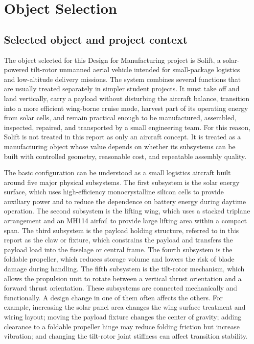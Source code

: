 \chapter{Object Selection}
\label{sec:object-selection}

\section{Selected object and project context}
\label{subsec:selected-object}

The object selected for this Design for Manufacturing project is Solift, a solar-powered tilt-rotor unmanned aerial vehicle intended for small-package logistics and low-altitude delivery missions. The system combines several functions that are usually treated separately in simpler student projects. It must take off and land vertically, carry a payload without disturbing the aircraft balance, transition into a more efficient wing-borne cruise mode, harvest part of its operating energy from solar cells, and remain practical enough to be manufactured, assembled, inspected, repaired, and transported by a small engineering team. For this reason, Solift is not treated in this report as only an aircraft concept. It is treated as a manufacturing object whose value depends on whether its subsystems can be built with controlled geometry, reasonable cost, and repeatable assembly quality.

The basic configuration can be understood as a small logistics aircraft built around five major physical subsystems. The first subsystem is the solar energy surface, which uses high-efficiency monocrystalline silicon cells to provide auxiliary power and to reduce the dependence on battery energy during daytime operation. The second subsystem is the lifting wing, which uses a stacked triplane arrangement and an MH114 airfoil to provide large lifting area within a compact span. The third subsystem is the payload holding structure, referred to in this report as the claw or fixture, which constrains the payload and transfers the payload load into the fuselage or central frame. The fourth subsystem is the foldable propeller, which reduces storage volume and lowers the risk of blade damage during handling. The fifth subsystem is the tilt-rotor mechanism, which allows the propulsion unit to rotate between a vertical thrust orientation and a forward thrust orientation. These subsystems are connected mechanically and functionally. A design change in one of them often affects the others. For example, increasing the solar panel area changes the wing surface treatment and wiring layout; moving the payload fixture changes the center of gravity; adding clearance to a foldable propeller hinge may reduce folding friction but increase vibration; and changing the tilt-rotor joint stiffness can affect transition stability.

